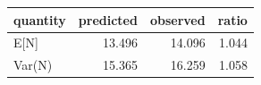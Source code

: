 \begin{tabular}{lrrr}
\toprule
quantity & predicted & observed & ratio \\
\midrule
E[N] & 13.496 & 14.096 & 1.044 \\
Var(N) & 15.365 & 16.259 & 1.058 \\
\bottomrule
\end{tabular}
